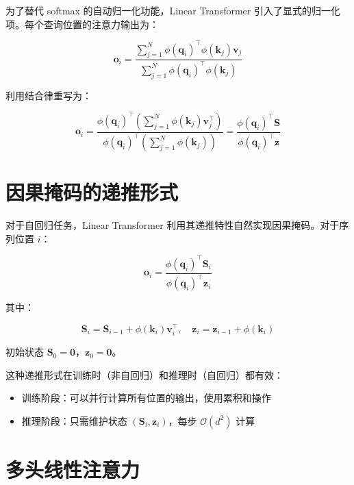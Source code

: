 为了替代 softmax 的自动归一化功能，Linear Transformer 引入了显式的归一化项。每个查询位置的注意力输出为：

\begin{equation}
    \mathbf{o}_i = \frac{\sum_{j=1}^N \phi(\mathbf{q}_i)^\top \phi(\mathbf{k}_j) \mathbf{v}_j}{\sum_{j=1}^N \phi(\mathbf{q}_i)^\top \phi(\mathbf{k}_j)}
\end{equation}

利用结合律重写为：

\begin{equation}
    \mathbf{o}_i = \frac{\phi(\mathbf{q}_i)^\top \left(\sum_{j=1}^N \phi(\mathbf{k}_j) \mathbf{v}_j^\top\right)}{\phi(\mathbf{q}_i)^\top \left(\sum_{j=1}^N \phi(\mathbf{k}_j)\right)} = \frac{\phi(\mathbf{q}_i)^\top \mathbf{S}}{\phi(\mathbf{q}_i)^\top \mathbf{z}}
\end{equation}

\section{因果掩码的递推形式}

对于自回归任务，Linear Transformer 利用其递推特性自然实现因果掩码。对于序列位置 $i$：

\begin{equation}
    \mathbf{o}_i = \frac{\phi(\mathbf{q}_i)^\top \mathbf{S}_i}{\phi(\mathbf{q}_i)^\top \mathbf{z}_i}
\end{equation}

其中：

\begin{equation}
    \mathbf{S}_i = \mathbf{S}_{i-1} + \phi(\mathbf{k}_i)\mathbf{v}_i^\top, \quad \mathbf{z}_i = \mathbf{z}_{i-1} + \phi(\mathbf{k}_i)
\end{equation}

初始状态 $\mathbf{S}_0 = \mathbf{0}$，$\mathbf{z}_0 = \mathbf{0}$。

这种递推形式在训练时（非自回归）和推理时（自回归）都有效：

\begin{itemize}
    \item 训练阶段：可以并行计算所有位置的输出，使用累积和操作
    \item 推理阶段：只需维护状态 $(\mathbf{S}_i, \mathbf{z}_i)$，每步 $\mathcal{O}(d^2)$ 计算
\end{itemize}

\section{多头线性注意力}

